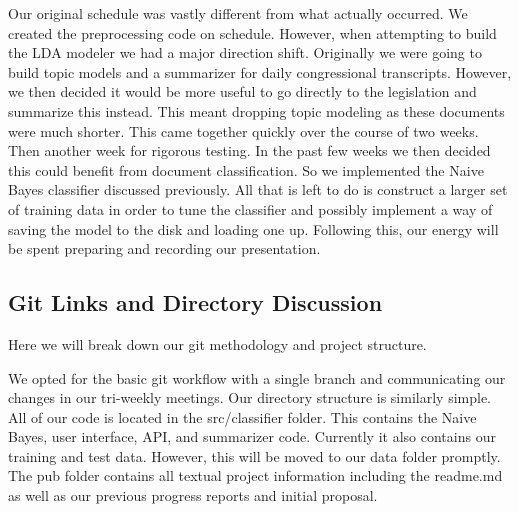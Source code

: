 \documentclass[11pt,a4paper]{article}
\begin{document}
Our original schedule was vastly different from what actually occurred. We created the preprocessing code on schedule. However, when attempting to build the LDA modeler we had a major direction shift. Originally we were going to build topic models and a summarizer for daily congressional transcripts. However, we then decided it would be more useful to go directly to the legislation and summarize this instead. This meant dropping topic modeling as these documents were much shorter. This came together quickly over the course of two weeks. Then another week for rigorous testing. In the past few weeks we then decided this could benefit from document classification. So we implemented the Naive Bayes classifier discussed previously. All that is left to do is construct a larger set of training data in order to tune the classifier and possibly implement a way of saving the model to the disk and loading one up. Following this, our energy will be spent preparing and recording our presentation. 

\subsection{Git Links and Directory Discussion}
Here we will break down our git methodology and project structure. 

We opted for the basic git workflow with a single branch and communicating our changes in our tri-weekly meetings. Our directory structure is similarly simple. All of our code is located in the src/classifier folder. This contains the Naive Bayes, user interface, API, and summarizer code. Currently it also contains our training and test data. However, this will be moved to our data folder promptly. The pub folder contains all textual project information including the readme.md as well as our previous progress reports and initial proposal. 
\end{document}
